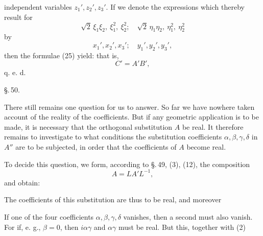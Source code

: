 independent variables $z_1', z_2', z_3'$. If we denote
the expressions which thereby result for
\[ \sqrt{2}\,\xi_1\xi_2,\ \xi_1^2,\ \xi_2^2;\quad \sqrt{2}\,\eta_1\eta_2,\ \eta_1^2,\ \eta_2^2 \]
by
\[ x_1', x_2', x_3';\quad y_1', y_2', y_3', \]
then the formulae (25) yield:
that is,
\[ C' = A'B', \]
q. e. d.

\begin{center}
\S.\,50.

\end{center}

There still remains one question for us to answer. So far
we have nowhere taken account of the reality of the coefficients.
But if any geometric application is to be made, it is
necessary that the orthogonal substitution $A$ be real. It therefore
remains to investigate to what conditions the substitution coefficients
$\alpha, \beta, \gamma, \delta$ in $A''$ are to
be subjected, in order that the coefficients of $A$ become real.

To decide this question, we form, according to \S.\,49, (3), (12),
the composition
\[ A = LA'L^{-1}, \]
and obtain:

The coefficients of this substitution are thus to be real,
and moreover

If one of the four coefficients $\alpha, \beta, \gamma, \delta$ vanishes,
then a second must also vanish. For if, e. g.,
$\beta = 0$, then $i\alpha\gamma$ and $\alpha\gamma$ must be real. But this, together with (2)
